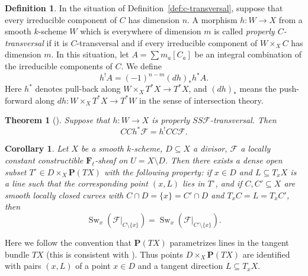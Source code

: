 \documentclass[twoside]{amsart}
\newcommand{\FF}{\mathbf{F}}
\newcommand{\PP}{\mathbf{P}}
\newcommand{\Ff}{\mathscr{F}}
\DeclareMathOperator{\Swan}{Sw}
\renewcommand{\to}{\longrightarrow}
\theoremstyle{plain}
\newtheorem{theorem}[subsubsection]{Theorem}
\newtheorem{corollary}[subsubsection]{Corollary}
\theoremstyle{definition}
\newtheorem{definition}[subsubsection]{Definition}
\theoremstyle{remark}
\numberwithin{equation}{subsection}
\begin{document}
\begin{definition} \label{def:properly-c-transversal}
	In the situation of Definition~\ref{def:c-transversal}, suppose that every irreducible component of $C$ has dimension $n$. A morphism $h\colon W\to X$ from a smooth $k$-scheme $W$ which is everywhere of dimension $m$ is called \emph{properly $C$-transversal} if it is $C$-transversal and if every irreducible component of $W\times_X C$ has dimension $m$. In this situation, let $A=\sum m_a [C_a]$ be an integral combination of the irreducible components of $C$. We define
	\[ 
		h^! A = (-1)^{n-m} (dh)_* h^* A.
	\]
	Here $h^*$ denotes pull-back along $W\times_X T^* X\to T^* X$, and $(dh)_*$ means the push-forward along $dh\colon W\times_X T^*X \to T^* W$ in the sense of intersection theory.
\end{definition}

\begin{theorem}[{\cite[Theorem~7.6]{Saito2016}}] \label{thm:ccpullback}
	Suppose that $h\colon W\to X$ is properly $SS\Ff$-transversal. Then
	\[ 
		CCh^* \Ff = h^! CC\Ff.
	\]
\end{theorem}

\begin{corollary} \label{cor:t-saito}
	Let $X$ be a smooth $k$-scheme, $D\subseteq X$ a divisor, $\Ff$ a locally constant constructible $\FF_\ell$-sheaf on $U=X\setminus D$. Then there exists a dense open subset $T^\circ\in D\times_X \PP(T X)$ with the following property: if $x\in D$ and $L\subseteq T_x X$ is a line such that the corresponding point $(x, L)$ lies in $T^\circ$, and if $C, C'\subseteq X$ are smooth locally closed curves with $C\cap D = \{x\} = C'\cap D$ and $T_x C = L = T_x C'$, then
	\[ 
		\Swan_x (\Ff|_{C\setminus \{x\}}) = \Swan_x (\Ff|_{C'\setminus \{x\}}).
	\]
\end{corollary}

Here we follow the convention that $\PP(T X)$ parametrizes lines in the tangent bundle $TX$ (this is consistent with \cite{Saito2016}). Thus points $D\times_X \PP(T X)$ are identified with pairs $(x, L)$ of a point $x\in D$ and a tangent direction $L\subseteq T_x X$.
\end{document}
